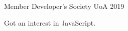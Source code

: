 \begin{cventries}
  \cventry
    {Member} %
    {Developer's Society} %
    {UoA} %
    {2019} %
    {
      \begin{cvitems} %
        \item {Got an interest in JavaScript.}
      \end{cvitems}
    }


\end{cventries}
